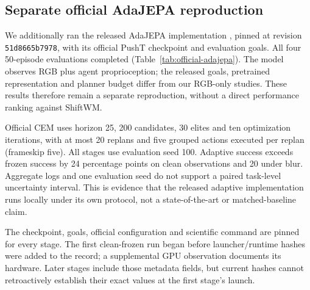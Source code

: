 \subsection{Separate official AdaJEPA reproduction}
\label{sec:official-adajepa}
We additionally ran the released AdaJEPA implementation
\citep{wang2026adajepa}, pinned at revision \texttt{51d8665b7978}, with
its official PushT checkpoint and evaluation goals. All four 50-episode
evaluations completed (Table~\ref{tab:official-adajepa}). The model
observes RGB plus agent proprioception; the released goals, pretrained
representation and planner budget differ from our RGB-only studies.
These results therefore remain a separate reproduction, without a
direct performance ranking against ShiftWM.

Official CEM uses horizon 25, 200 candidates, 30 elites and ten
optimization iterations, with at most 20 replans and five grouped
actions executed per replan (frameskip five). All stages use evaluation
seed 100. Adaptive success exceeds frozen success by 24 percentage
points on clean observations and 20 under blur. Aggregate logs and one
evaluation seed do not support a paired task-level uncertainty interval.
This is evidence that the released adaptive implementation runs locally
under its own protocol, not a state-of-the-art or matched-baseline claim.

The checkpoint, goals, official configuration and scientific command
are pinned for every stage. The first clean-frozen run began before
launcher/runtime hashes were added to the record; a supplemental GPU
observation documents its hardware. Later stages include those metadata
fields, but current hashes cannot retroactively establish their exact
values at the first stage's launch.

\begin{table}[H]
\centering\small
\setlength{\tabcolsep}{7pt}

\caption{\textbf{Official AdaJEPA reproduction under its separate protocol.}
Each entry uses 50 released evaluation goals and seed 100, with RGB plus
agent proprioception. Differences compare adaptive and frozen execution
within this official protocol.  marks positive
aggregate point differences; no paired interval or significance claim
is made. These inputs and budgets are not matched to ShiftWM.}
\label{tab:official-adajepa}
\end{table}
